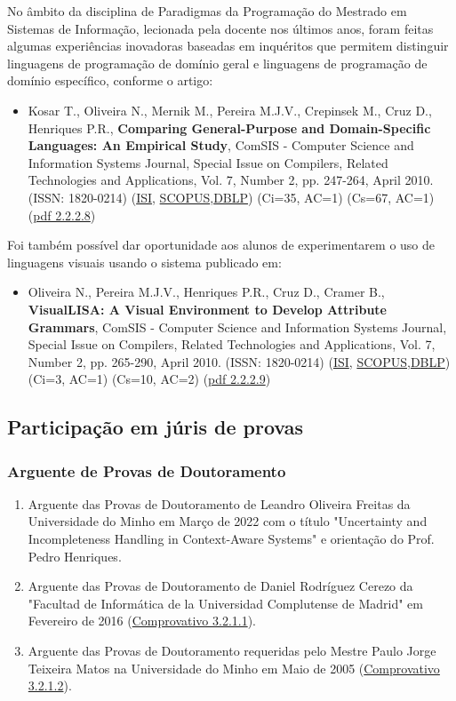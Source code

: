 \documentclass[11pt]{article}
\begin{document}
No âmbito da disciplina de Paradigmas da Programação do Mestrado em Sistemas de Informação, lecionada pela docente nos últimos anos, foram feitas algumas experiências inovadoras baseadas em inquéritos que permitem distinguir linguagens de programação de domínio geral e linguagens de programação de domínio específico, conforme o artigo:
\begin{itemize}
\item {Kosar T., Oliveira N., Mernik M., Pereira M.J.V., Crepinsek M., Cruz D., Henriques P.R., {\bf{ Comparing General-Purpose and Domain-Specific Languages: An Empirical Study}}, ComSIS - Computer Science and Information Systems Journal, Special Issue on Compilers, Related Technologies and Applications, Vol. 7, Number 2, pp. 247-264, April 2010. (ISSN: 1820-0214) (\href{run:Publicacoes/ComprovativosISI.pdf}{ISI}, \href{run:Publicacoes/PublicacoesSCOPUS.pdf}{SCOPUS},\href{run:Publicacoes/ComprovativosDBLP.pdf}{DBLP}) (Ci=35, AC=1) (Cs=67, AC=1) (\href{run:Publicacoes/publicacoes/49.pdf}{pdf 2.2.2.8})}
\end{itemize}
Foi também possível dar oportunidade aos alunos de experimentarem o uso de linguagens visuais usando o sistema publicado em:
\begin{itemize}
\item {Oliveira N., Pereira M.J.V., Henriques P.R., Cruz D., Cramer B., {\bf{ VisualLISA: A Visual Environment to Develop Attribute Grammars}}, ComSIS - Computer Science and Information Systems Journal, Special Issue on Compilers, Related Technologies and Applications, Vol. 7, Number 2, pp. 265-290, April 2010. (ISSN: 1820-0214) (\href{run:Publicacoes/ComprovativosISI.pdf}{ISI}, \href{run:Publicacoes/PublicacoesSCOPUS.pdf}{SCOPUS},\href{run:Publicacoes/ComprovativosDBLP.pdf}{DBLP}) (Ci=3, AC=1) (Cs=10, AC=2) (\href{run:Publicacoes/publicacoes/52.pdf}{pdf 2.2.2.9})}
\end{itemize}



\subsection{Participação em júris de provas}
\subsubsection{Arguente de Provas de Doutoramento}
\begin{enumerate}
\item {Arguente das Provas de Doutoramento de Leandro Oliveira Freitas da Universidade do Minho em Março de 2022 com o título "Uncertainty and Incompleteness Handling in Context-Aware Systems" e orientação do Prof. Pedro Henriques.}
\item {Arguente das Provas de Doutoramento de Daniel Rodríguez Cerezo da "Facultad de Informática de la Universidad Complutense de Madrid" em Fevereiro de 2016 (\href{run:JuriProvas/TesisDaniel.pdf}{Comprovativo 3.2.1.1}).}
\item {Arguente das Provas de Doutoramento requeridas pelo Mestre Paulo Jorge Teixeira Matos na Universidade do Minho em Maio de 2005 (\href{run:JuriProvas/JuriDoutoramentoPauloMatos.pdf}{Comprovativo 3.2.1.2}).}
\end{enumerate}
\end{document}
